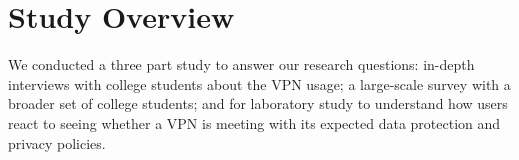 \section{Study Overview}\label{sec:overview}

We conducted a three part study to answer our research questions:  in-depth interviews  with college students about the VPN usage;  a large-scale survey with a broader set of college students; and  for laboratory study to understand how users react to seeing whether a VPN is meeting with its expected data protection and privacy policies. 


